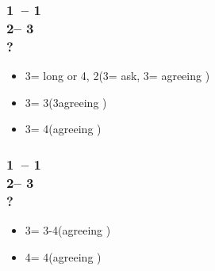 \documentclass[12pt, a4paper]{report}
\begin{document}
\subsubsection*{1\diams\ -- 1\spades \\
                2\nt -- 3\clubs\\
                ?}
\begin{itemize}
    \item 3\diams = long \diams or 4\clubs, 2\spades (3\hearts = ask, 3\spades = agreeing \spades)
    \item 3\hearts = 3\spades (3\spades agreeing \spades)
    \item 3\spades = 4\spades (agreeing \spades)
\end{itemize}

\subsubsection*{1\diams\ -- 1\spades \\
                2\nt -- 3\hearts\\
                ?}
\begin{itemize}
    \item 3\spades = 3-4\spades (agreeing \spades)
    \item 4\clubs = 4\hearts (agreeing \hearts)
\end{itemize}
\end{document}
